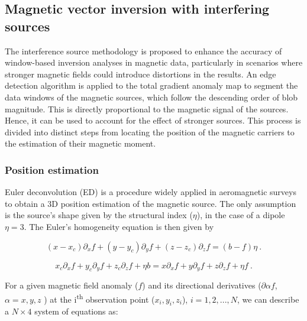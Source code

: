 \subsection{Magnetic vector inversion with interfering sources}\label{inversion-section}

The interference source methodology is proposed to enhance the accuracy of window-based inversion analyses in magnetic data, particularly in scenarios where stronger magnetic fields could introduce distortions in the results. An edge detection algorithm is applied to the total gradient anomaly map to segment the data windows of the magnetic sources, which follow the descending order of blob magnitude. This is directly proportional to the magnetic signal of the sources. Hence, it can be used to account for the effect of stronger sources. This process is divided into distinct steps from locating the position of the magnetic carriers to the estimation of their magnetic moment.

\subsubsection{Position estimation}
    Euler deconvolution (ED) is a procedure widely applied in aeromagnetic surveys \citep{Barbosa2011, Melo2013} to obtain a 3D position estimation \cite[after][]{Reid1990} of the magnetic source. The only assumption is the source's shape given by the structural index ($\eta$), in the case of a dipole $\eta = 3$. The Euler's homogeneity equation is then given by
    
        \begin{equation}
        \label{eq_euler_homogeneity}
        (x - x_c)\partial_x f
        + (y - y_c)\partial_y f
        + (z - z_c)\partial_z f
        = (b - f)\eta
        \ .
        \end{equation}
    
    
    \begin{equation}
    x_c \partial_x f + y_c \partial_y f + z_c \partial_z f + \eta b
    =
    x \partial_x f + y \partial_y f + z \partial_z f + \eta f
    \ .
    \end{equation}
    
    For a given magnetic field anomaly ($f$) and its directional derivatives ($\partial \alpha f$, $\alpha = x, y, z$ ) at the i\textsuperscript{th} observation point ($x_i, y_i, z_i$), $i=1, 2,..., N$, we can describe a $N \times 4$ system of equations as:
    
